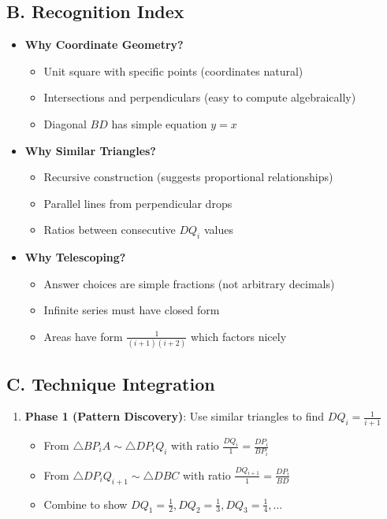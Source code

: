 \documentclass[]{article}
\begin{document}
\begin{techniquesbox}
\subsection*{B. Recognition Index}
\begin{itemize}[leftmargin=*]
    \item \textbf{Why Coordinate Geometry?}
    \begin{itemize}
        \item Unit square with specific points (coordinates natural)
        \item Intersections and perpendiculars (easy to compute algebraically)
        \item Diagonal $BD$ has simple equation $y=x$
    \end{itemize}
    
    \item \textbf{Why Similar Triangles?}
    \begin{itemize}
        \item Recursive construction (suggests proportional relationships)
        \item Parallel lines from perpendicular drops
        \item Ratios between consecutive $DQ_i$ values
    \end{itemize}
    
    \item \textbf{Why Telescoping?}
    \begin{itemize}
        \item Answer choices are simple fractions (not arbitrary decimals)
        \item Infinite series must have closed form
        \item Areas have form $\frac{1}{(i+1)(i+2)}$ which factors nicely
    \end{itemize}
\end{itemize}

\subsection*{C. Technique Integration}
\begin{enumerate}
    \item \textbf{Phase 1 (Pattern Discovery)}: Use similar triangles to find $DQ_i = \frac{1}{i+1}$
    \begin{itemize}
        \item From $\triangle BP_iA \sim \triangle DP_iQ_i$ with ratio $\frac{DQ_i}{1} = \frac{DP_i}{BP_i}$
        \item From $\triangle DP_iQ_{i+1} \sim \triangle DBC$ with ratio $\frac{DQ_{i+1}}{1} = \frac{DP_i}{BD}$
        \item Combine to show $DQ_1 = \frac{1}{2}, DQ_2 = \frac{1}{3}, DQ_3 = \frac{1}{4}, \ldots$
    \end{itemize}
    

\end{enumerate}
\end{techniquesbox}
\end{document}
